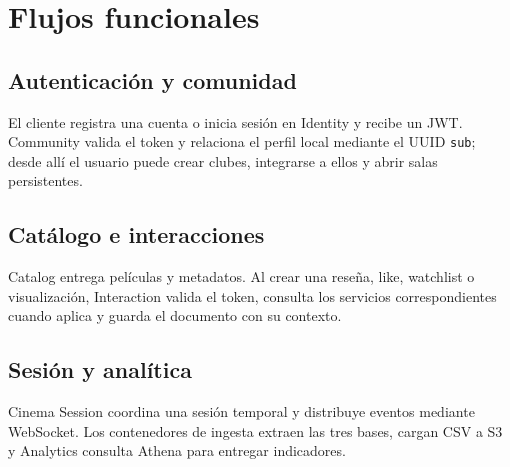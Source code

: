 \chapter{Flujos funcionales}
\section{Autenticación y comunidad}
El cliente registra una cuenta o inicia sesión en Identity y recibe un JWT. Community valida el token y relaciona el perfil local mediante el UUID \texttt{sub}; desde allí el usuario puede crear clubes, integrarse a ellos y abrir salas persistentes.
\section{Catálogo e interacciones}
Catalog entrega películas y metadatos. Al crear una reseña, like, watchlist o visualización, Interaction valida el token, consulta los servicios correspondientes cuando aplica y guarda el documento con su contexto.
\section{Sesión y analítica}
Cinema Session coordina una sesión temporal y distribuye eventos mediante WebSocket. Los contenedores de ingesta extraen las tres bases, cargan CSV a S3 y Analytics consulta Athena para entregar indicadores.

